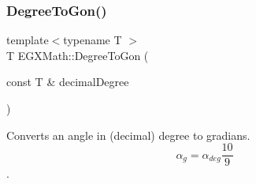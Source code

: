 \mbox{\label{group___e_g_x_math-_angle_conversions-_degree_ga87c3fab0867021e5d2501197b4db6194}} 
\subsubsection{\texorpdfstring{Degree\+To\+Gon()}{DegreeToGon()}}
{\footnotesize\ttfamily template$<$typename T $>$ \\
T E\+G\+X\+Math\+::\+Degree\+To\+Gon (\begin{DoxyParamCaption}\item[{const T \&}]{decimal\+Degree }\end{DoxyParamCaption})}



Converts an angle in (decimal) degree to gradians. \[\alpha_{g}=\alpha_{deg}\frac{10}{9}\]. 


